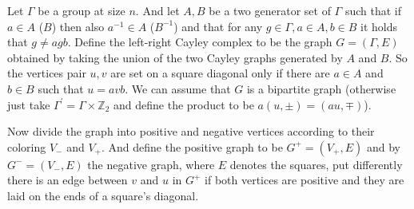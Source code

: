 \begin{definition}

%
%
%
  Let $\Gamma$ be a group at size $n$. And let $A,B$ be a two generator set of $\Gamma$ such that if $a \in A$ ($B$) then also $a^{-1}\in A$ ($B^{-1}$) and that for any $g\in \Gamma, a \in A, b \in B$ it holds that $g \neq agb$. Define the left-right Cayley complex to be the graph $G = \left( \Gamma, E \right)$ obtained by taking the union of the two Cayley graphs generated by $A$ and $B$. So the vertices pair $u,v$ are set on a square diagonal only if there are $a\in A$ and $b \in B$ such that $u = avb$. We can assume that $G$ is a bipartite graph (otherwise just take $\Gamma^{\prime} = \Gamma \times \mathbb{Z}_{2}$ and define the product to be $a\left( u,\pm \right) = \left( au, \mp \right)$). 


Now divide the graph into positive and negative vertices according to their coloring $V_{-}$ and $V_{+}$. And define the positive graph to be $G^{+} = \left( V_{+}, E \right)$ and by $G^{-} = \left( V_{-}, E \right)$ the negative graph, where $E$ denotes the squares, put differently there is an edge between $v$ and $u$ in $G^{+}$ if both vertices are positive and they are laid on the ends of a square's diagonal.



\end{definition}
